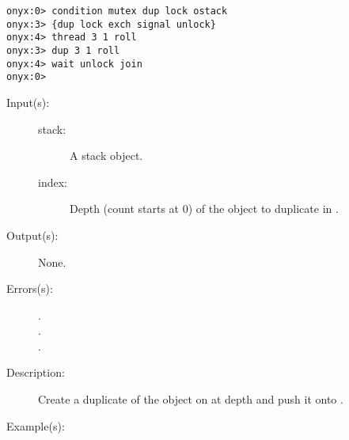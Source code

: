 \begin{description}
\begin{description}
\begin{verbatim}
onyx:0> condition mutex dup lock ostack
onyx:3> {dup lock exch signal unlock}
onyx:4> thread 3 1 roll
onyx:3> dup 3 1 roll
onyx:4> wait unlock join
onyx:0>
		\end{verbatim}
	\end{description}
\label{systemdict:sindex}
\item[{\onyxop{stack index}{sindex}{--}}: ]
	\begin{description}\item[]
	\item[Input(s): ]
		\begin{description}\item[]
		\item[stack: ]
			A stack object.
		\item[index: ]
			Depth (count starts at 0) of the object to duplicate in
			.
		\end{description}
	\item[Output(s): ] None.
	\item[Errors(s): ]
		\begin{description}\item[]
		\item[.]
		\item[.]
		\item[.]
		\end{description}
	\item[Description: ]
		Create a duplicate of the object on  at depth
		 and push it onto .
	\item[Example(s): ]\begin{verbatim}


\end{verbatim}
\end{description}
\end{description}
